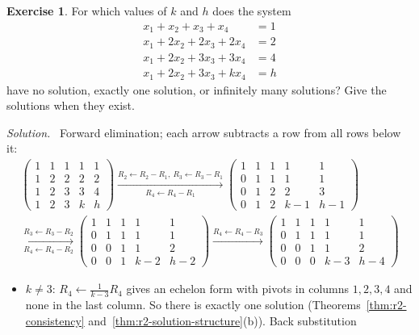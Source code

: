 \documentclass[12pt]{article}
\theoremstyle{definition}
\newtheorem{exercise}{Exercise}
\newenvironment{solution}{\par\noindent\textit{Solution.}\ }{\par\smallskip}
\begin{document}
\begin{exercise}\label{r2-ex-parameters}
For which values of \(k\) and \(h\) does the system
\[
\begin{aligned}
x_1+x_2+x_3+x_4&=1\\
x_1+2x_2+2x_3+2x_4&=2\\
x_1+2x_2+3x_3+3x_4&=4\\
x_1+2x_2+3x_3+kx_4&=h
\end{aligned}
\]
have no solution, exactly one solution, or infinitely many solutions? Give the solutions when
they exist.
\end{exercise}
\begin{solution}
Forward elimination; each arrow subtracts a row from all rows below it:
\[
\begin{gathered}
\left(\begin{array}{cccc|c}1&1&1&1&1\\1&2&2&2&2\\1&2&3&3&4\\1&2&3&k&h\end{array}\right)
\xrightarrow[R_4\leftarrow R_4-R_1]{R_2\leftarrow R_2-R_1,\ R_3\leftarrow R_3-R_1}
\left(\begin{array}{cccc|c}1&1&1&1&1\\0&1&1&1&1\\0&1&2&2&3\\0&1&2&k-1&h-1\end{array}\right)
\\
\xrightarrow[R_4\leftarrow R_4-R_2]{R_3\leftarrow R_3-R_2}
\left(\begin{array}{cccc|c}1&1&1&1&1\\0&1&1&1&1\\0&0&1&1&2\\0&0&1&k-2&h-2\end{array}\right)
\xrightarrow{R_4\leftarrow R_4-R_3}
\left(\begin{array}{cccc|c}1&1&1&1&1\\0&1&1&1&1\\0&0&1&1&2\\0&0&0&k-3&h-4\end{array}\right)
\end{gathered}
\]
\begin{itemize}
\item \(k\ne3\): \(R_4\leftarrow\frac1{k-3}R_4\) gives an echelon form with pivots in columns
\(1,2,3,4\) and none in the last column. So there is exactly one solution
(Theorems~\ref{thm:r2-consistency} and~\ref{thm:r2-solution-structure}(b)). Back substitution

\end{itemize}
\end{solution}
\end{document}
